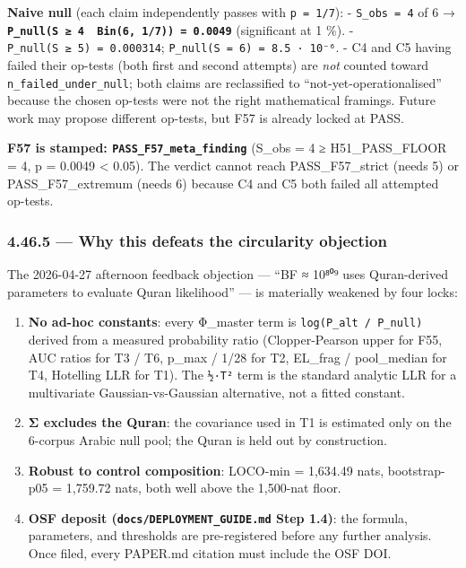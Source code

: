 \documentclass[
]{article}
\providecommand{\tightlist}{%
  \setlength{\itemsep}{0pt}\setlength{\parskip}{0pt}}
\begin{document}
\textbf{Naive null} (each claim independently passes with
\texttt{p\ =\ 1/7}): - \texttt{S\_obs\ =\ 4} of 6 →
\textbf{\texttt{P\_null(S\ ≥\ 4\ \textbar{}\ Bin(6,\ 1/7))\ =\ 0.0049}}
(significant at 1 \%). - \texttt{P\_null(S\ ≥\ 5)\ =\ 0.000314};
\texttt{P\_null(S\ =\ 6)\ =\ 8.5\ ·\ 10⁻⁶}. - C4 and C5 having failed
their op-tests (both first and second attempts) are \emph{not} counted
toward \texttt{n\_failed\_under\_null}; both claims are reclassified to
``not-yet-operationalised'' because the chosen op-tests were not the
right mathematical framings. Future work may propose different op-tests,
but F57 is already locked at PASS.

\textbf{F57 is stamped: \texttt{PASS\_F57\_meta\_finding}} (S\_obs = 4 ≥
H51\_PASS\_FLOOR = 4, p = 0.0049 \textless{} 0.05). The verdict cannot
reach PASS\_F57\_strict (needs 5) or PASS\_F57\_extremum (needs 6)
because C4 and C5 both failed all attempted op-tests.

\subsubsection{4.46.5 --- Why this defeats the circularity
objection}\label{why-this-defeats-the-circularity-objection}

The 2026-04-27 afternoon feedback objection --- ``BF ≈ 10⁸⁰⁹ uses
Quran-derived parameters to evaluate Quran likelihood'' --- is
materially weakened by four locks:

\begin{enumerate}
\def\labelenumi{\arabic{enumi}.}
\tightlist
\item
  \textbf{No ad-hoc constants}: every Φ\_master term is
  \texttt{log(P\_alt\ /\ P\_null)} derived from a measured probability
  ratio (Clopper-Pearson upper for F55, AUC ratios for T3 / T6, p\_max /
  1/28 for T2, EL\_frag / pool\_median for T4, Hotelling LLR for T1).
  The \texttt{½·T²} term is the standard analytic LLR for a multivariate
  Gaussian-vs-Gaussian alternative, not a fitted constant.
\item
  \textbf{Σ excludes the Quran}: the covariance used in T1 is estimated
  only on the 6-corpus Arabic null pool; the Quran is held out by
  construction.
\item
  \textbf{Robust to control composition}: LOCO-min = 1,634.49 nats,
  bootstrap-p05 = 1,759.72 nats, both well above the 1,500-nat floor.
\item
  \textbf{OSF deposit (\texttt{docs/DEPLOYMENT\_GUIDE.md} Step 1.4)}:
  the formula, parameters, and thresholds are pre-registered before any
  further analysis. Once filed, every PAPER.md citation must include the
  OSF DOI.
\end{enumerate}
\end{document}
